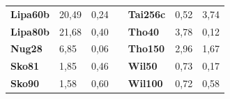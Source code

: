 \documentclass[a4paper, 12pt]{article}
\begin{document}
\begin{table}[H]
\begin{tabular}{|l|l|l|l|l|l|l|}
\textbf{Lipa60b}                    & 20,49                              & 0,24                                 &                                & \textbf{Tai256c}                   & 0,52                               & 3,74                                 \\ \cline{1-3} \cline{5-7} 
\textbf{Lipa80b}                    & 21,68                              & 0,40                                 &                                & \textbf{Tho40}                     & 3,78                               & 0,12                                 \\ \cline{1-3} \cline{5-7} 
\textbf{Nug28}                      & 6,85                               & 0,06                                 &                                & \textbf{Tho150}                    & 2,96                               & 1,67                                 \\ \cline{1-3} \cline{5-7} 
\textbf{Sko81}                      & 1,85                               & 0,46                                 &                                & \textbf{Wil50}                     & 0,73                               & 0,17                                 \\ \cline{1-3} \cline{5-7} 
\textbf{Sko90}                      & 1,58                               & 0,60                                 &                                & \textbf{Wil100}                    & 0,72                               & 0,58                                 \\ \cline{1-3} \cline{5-7} 
\end{tabular}
\end{table}
      
      \newpage
\end{document}
